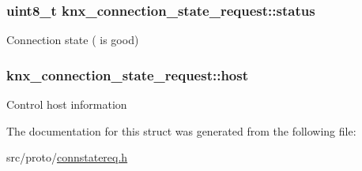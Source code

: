 \subsubsection[{\texorpdfstring{status}{status}}]{\setlength{\rightskip}{0pt plus 5cm}uint8\+\_\+t knx\+\_\+connection\+\_\+state\+\_\+request\+::status}\hypertarget{structknx__connection__state__request_a7bfce413c5ccc058ace71e3350360ecf}{}\label{structknx__connection__state__request_a7bfce413c5ccc058ace71e3350360ecf}
Connection state ({} is good) 
\subsubsection[{\texorpdfstring{host}{host}}]{ knx\+\_\+connection\+\_\+state\+\_\+request\+::host}\hypertarget{structknx__connection__state__request_ad0f9ad162a236581ef5f7be4fa236561}{}\label{structknx__connection__state__request_ad0f9ad162a236581ef5f7be4fa236561}
Control host information 

The documentation for this struct was generated from the following file\+:\begin{DoxyCompactItemize}
\item 
src/proto/\hyperlink{connstatereq_8h}{connstatereq.\+h}\end{DoxyCompactItemize}
